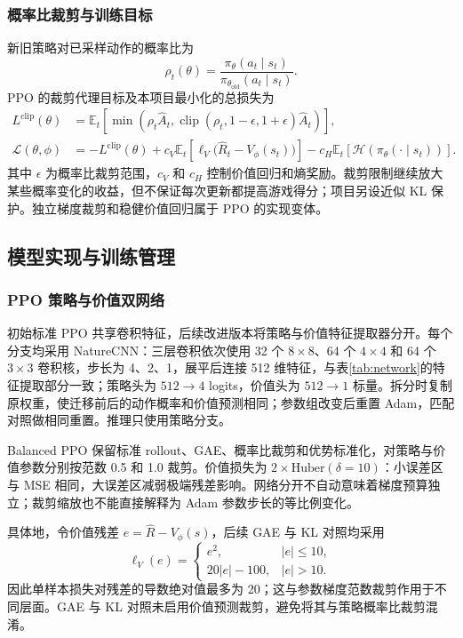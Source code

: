 \subsubsection{概率比裁剪与训练目标}
新旧策略对已采样动作的概率比为
\begin{equation}
 \rho_t(\theta)=\frac{\pi_\theta(a_t\mid s_t)}{\pi_{\theta_{\mathrm{old}}}(a_t\mid s_t)}.
\end{equation}
PPO 的裁剪代理目标及本项目最小化的总损失为
\begin{align}
 L^{\mathrm{clip}}(\theta)&=\mathbb E_t\!\left[\min\!\left(\rho_t\widehat A_t,
 \operatorname{clip}(\rho_t,1-\epsilon,1+\epsilon)\widehat A_t\right)\right],\\
 \mathcal L(\theta,\phi)&=-L^{\mathrm{clip}}(\theta)
 +c_V\mathbb E_t\!\left[\ell_V\bigl(\widehat R_t-V_\phi(s_t)\bigr)\right]
 -c_H\mathbb E_t\!\left[\mathcal H(\pi_\theta(\cdot\mid s_t))\right].
\end{align}
其中 $\epsilon$ 为概率比裁剪范围，$c_V$ 和 $c_H$ 控制价值回归和熵奖励。裁剪限制继续放大某些概率变化的收益，但不保证每次更新都提高游戏得分；项目另设近似 KL 保护。独立梯度裁剪和稳健价值回归属于 PPO 的实现变体。

\subsection{模型实现与训练管理}
\subsubsection{PPO 策略与价值双网络}
初始标准 PPO 共享卷积特征，后续改进版本将策略与价值特征提取器分开。每个分支均采用 NatureCNN：三层卷积依次使用 32 个 $8\times8$、64 个 $4\times4$ 和 64 个 $3\times3$ 卷积核，步长为 4、2、1，展平后连接 512 维特征，与表\ref{tab:network}的特征提取部分一致；策略头为 $512\rightarrow4$ logits，价值头为 $512\rightarrow1$ 标量。拆分时复制原权重，使迁移前后的动作概率和价值预测相同；参数组改变后重置 Adam，匹配对照做相同重置。推理只使用策略分支。

Balanced PPO 保留标准 rollout、GAE、概率比裁剪和优势标准化，对策略与价值参数分别按范数 0.5 和 1.0 裁剪。价值损失为 $2\times\mathrm{Huber}(\delta=10)$：小误差区与 MSE 相同，大误差区减弱极端残差影响。网络分开不自动意味着梯度预算独立；裁剪缩放也不能直接解释为 Adam 参数步长的等比例变化。

具体地，令价值残差 $e=\widehat R-V_\phi(s)$，后续 GAE 与 KL 对照均采用
\begin{equation}
 \ell_V(e)=\begin{cases}
 e^2, & |e|\leq 10,\\
 20|e|-100, & |e|>10.
 \end{cases}
\end{equation}
因此单样本损失对残差的导数绝对值最多为 20；这与参数梯度范数裁剪作用于不同层面。GAE 与 KL 对照未启用价值预测裁剪，避免将其与策略概率比裁剪混淆。

